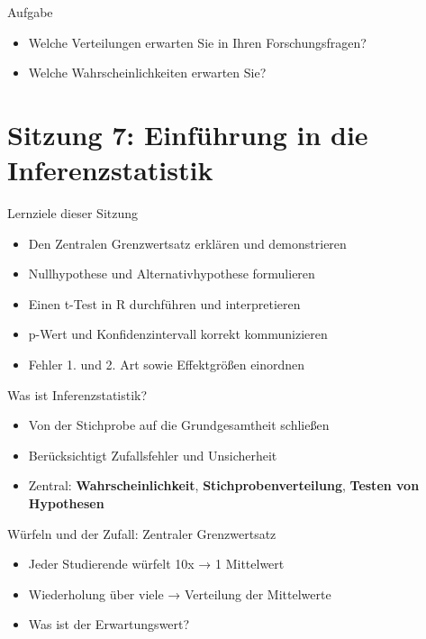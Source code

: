 \documentclass[
  ignorenonframetext,
]{beamer}
\providecommand{\tightlist}{%
  \setlength{\itemsep}{0pt}\setlength{\parskip}{0pt}}
\begin{document}
\begin{frame}{Aufgabe}
\protect{}\label{aufgabe}
\begin{itemize}
\tightlist
\item
  Welche Verteilungen erwarten Sie in Ihren Forschungsfragen?
\item
  Welche Wahrscheinlichkeiten erwarten Sie?
\end{itemize}
\end{frame}

\section{Sitzung 7: Einführung in die
Inferenzstatistik}\label{sitzung-7-einfuxfchrung-in-die-inferenzstatistik}

\begin{frame}{Lernziele dieser Sitzung}
\protect{}\label{lernziele-dieser-sitzung-5}
\begin{itemize}
\tightlist
\item
  Den Zentralen Grenzwertsatz erklären und demonstrieren
\item
  Nullhypothese und Alternativhypothese formulieren
\item
  Einen t-Test in R durchführen und interpretieren
\item
  p-Wert und Konfidenzintervall korrekt kommunizieren
\item
  Fehler 1. und 2. Art sowie Effektgrößen einordnen
\end{itemize}
\end{frame}

\begin{frame}{Was ist Inferenzstatistik?}
\protect{}\label{was-ist-inferenzstatistik}
\begin{itemize}
\tightlist
\item
  Von der Stichprobe auf die Grundgesamtheit schließen
\item
  Berücksichtigt Zufallsfehler und Unsicherheit
\item
  Zentral: \textbf{Wahrscheinlichkeit}, \textbf{Stichprobenverteilung},
  \textbf{Testen von Hypothesen}
\end{itemize}
\end{frame}

\begin{frame}{Würfeln und der Zufall: Zentraler Grenzwertsatz}
\protect{}\label{wuxfcrfeln-und-der-zufall-zentraler-grenzwertsatz}
\begin{itemize}
\tightlist
\item
  Jeder Studierende würfelt 10x → 1 Mittelwert
\item
  Wiederholung über viele → Verteilung der Mittelwerte
\item
  Was ist der Erwartungswert?
\end{itemize}
\end{frame}
\end{document}
